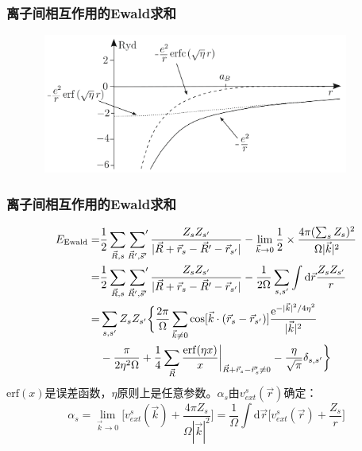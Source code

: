 \documentclass[cjk,slidestop,compress,mathserif,blue]{beamer}
\begin{document}
\frame
{
	\frametitle{离子间相互作用的\textrm{Ewald}求和}
\begin{figure}[h!]
\centering
\includegraphics[height=1.8in,width=4.12in,viewport=0 0 1100 455,clip]{Figures/Ewald_method.png}
\caption{\fontsize{5.5pt}{2.2pt}}%
\label{Error_Function}
\end{figure}
}

\frame
{
	\frametitle{离子间相互作用的\textrm{Ewald}求和}
	\begin{displaymath}
		\begin{aligned}
			E_{\textrm{Ewald}}=&\dfrac12\sum_{\vec R,s}\sideset{}{^{\prime}}\sum_{\vec R^{\prime},\vec s^{\prime}}\dfrac{Z_sZ_{s^{\prime}}}{|\vec R+\vec r_s-\vec R^{\prime}-\vec r_{s^{\prime}}|}-\lim_{\vec k\rightarrow0}\dfrac12\times\dfrac{4\pi(\sum_sZ_s)^2}{\Omega|\vec k|^2}\\
			=&\dfrac12\sum_{\vec R,s}\sideset{}{^{\prime}}\sum_{\vec R^{\prime},\vec s^{\prime}}\dfrac{Z_sZ_{s^{\prime}}}{|\vec R+\vec r_s-\vec R^{\prime}-\vec r_{s^{\prime}}|}-\dfrac1{2\Omega}\sum_{s,s^{\prime}}\int\mathrm{d}\vec r\dfrac{Z_sZ_{s^{\prime}}}r\\
			=&\sum_{s,s^{\prime}}Z_sZ_{s^{\prime}}\bigg\{\dfrac{2\pi}{\Omega}\sum_{\vec k\neq 0}\cos[\vec k\cdot(\vec r_s-\vec r_{s^{\prime}})]\dfrac{\mathrm{e}^{-|\vec k|^2/4\eta^2}}{|\vec k|^2}\\
			&-\dfrac{\pi}{2\eta^2\Omega}+\dfrac14\sum_{\vec R}\dfrac{\mathrm{erf}(\eta x)}x\bigg|_{\vec R+\vec r_s-\vec r_s^{\prime}\neq0}-\dfrac{\eta}{\sqrt{\pi}}\delta_{s,s^{\prime}}\bigg\}
		\end{aligned}
	\end{displaymath}
	$\mathrm{erf}(x)$是误差函数，$\eta$原则上是任意参数。$\alpha_s$由$v_{ext}^s(\vec r)$确定：
	\begin{displaymath}
		\alpha_s=\lim_{\vec k\rightarrow0}\bigg[v_{ext}^s(\vec k)+\dfrac{4\pi Z_s}{\Omega|\vec k|^2}\bigg]=\dfrac1{\Omega}\int\mathrm{d}\vec r\bigg[v_{ext}^s(\vec r)+\dfrac{Z_s}r\bigg]
	\end{displaymath}
}
\end{document}
